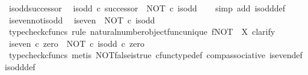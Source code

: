 \begin{isabellebody}
\endisatagproof
{\isafoldproof}%
%
\isadelimproof
\isanewline
%
\endisadelimproof
\isanewline
{}\isamarkupfalse%
\ is{\isacharunderscore}{\kern0pt}odd{\isacharunderscore}{\kern0pt}successor{\isacharcolon}{\kern0pt}\isanewline
\ \ {\isachardoublequoteopen}is{\isacharunderscore}{\kern0pt}odd\ {\isasymcirc}\isactrlsub c\ successor\ {\isacharequal}{\kern0pt}\ NOT\ {\isasymcirc}\isactrlsub c\ is{\isacharunderscore}{\kern0pt}odd{\isachardoublequoteclose}\isanewline
%
\isadelimproof
\ \ %
\endisadelimproof
%
\isatagproof
{}\isamarkupfalse%
\ {\isacharparenleft}{\kern0pt}simp\ add{\isacharcolon}{\kern0pt}\ is{\isacharunderscore}{\kern0pt}odd{\isacharunderscore}{\kern0pt}def{}{\isacharparenright}{\kern0pt}%
\endisatagproof
{\isafoldproof}%
%
\isadelimproof
\isanewline
%
\endisadelimproof
\isanewline
{}\isamarkupfalse%
\ is{\isacharunderscore}{\kern0pt}even{\isacharunderscore}{\kern0pt}not{\isacharunderscore}{\kern0pt}is{\isacharunderscore}{\kern0pt}odd{\isacharcolon}{\kern0pt}\isanewline
\ \ {\isachardoublequoteopen}is{\isacharunderscore}{\kern0pt}even\ {\isacharequal}{\kern0pt}\ NOT\ {\isasymcirc}\isactrlsub c\ is{\isacharunderscore}{\kern0pt}odd{\isachardoublequoteclose}\isanewline
%
\isadelimproof
%
\endisadelimproof
%
\isatagproof
{}\isamarkupfalse%
\ {\isacharparenleft}{\kern0pt}typecheck{\isacharunderscore}{\kern0pt}cfuncs{\isacharcomma}{\kern0pt}\ rule\ natural{\isacharunderscore}{\kern0pt}number{\isacharunderscore}{\kern0pt}object{\isacharunderscore}{\kern0pt}func{\isacharunderscore}{\kern0pt}unique{\isacharbrackleft}{\kern0pt}\ f{\isacharequal}{\kern0pt}{\isachardoublequoteopen}NOT{\isachardoublequoteclose}{\isacharcomma}{\kern0pt}\ \ X{\isacharequal}{\kern0pt}{\isachardoublequoteopen}{\isasymOmega}{\isachardoublequoteclose}{\isacharbrackright}{\kern0pt}{\isacharcomma}{\kern0pt}\ clarify{\isacharparenright}{\kern0pt}\isanewline
\ \ \isamarkupfalse%
\ {\isachardoublequoteopen}is{\isacharunderscore}{\kern0pt}even\ {\isasymcirc}\isactrlsub c\ zero\ {\isacharequal}{\kern0pt}\ {\isacharparenleft}{\kern0pt}NOT\ {\isasymcirc}\isactrlsub c\ is{\isacharunderscore}{\kern0pt}odd{\isacharparenright}{\kern0pt}\ {\isasymcirc}\isactrlsub c\ zero{\isachardoublequoteclose}\isanewline
\ \ \ \ \isamarkupfalse%
\ {\isacharparenleft}{\kern0pt}typecheck{\isacharunderscore}{\kern0pt}cfuncs{\isacharcomma}{\kern0pt}\ metis\ NOT{\isacharunderscore}{\kern0pt}false{\isacharunderscore}{\kern0pt}is{\isacharunderscore}{\kern0pt}true\ cfunc{\isacharunderscore}{\kern0pt}type{\isacharunderscore}{\kern0pt}def\ comp{\isacharunderscore}{\kern0pt}associative\ is{\isacharunderscore}{\kern0pt}even{\isacharunderscore}{\kern0pt}def{}\ is{\isacharunderscore}{\kern0pt}odd{\isacharunderscore}{\kern0pt}def{}{\isacharparenright}{\kern0pt}\isanewline

\end{isabellebody}
